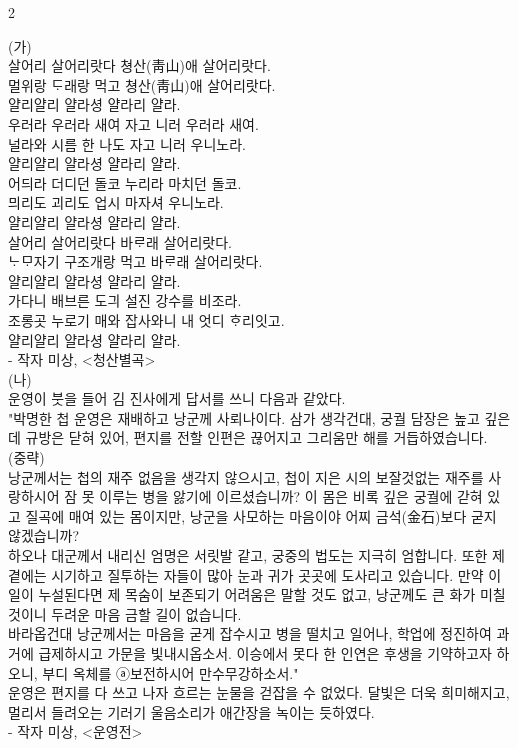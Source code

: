 \documentclass[10pt, a4paper]{article}
\begin{document}
\begin{multicols}{2}
\begin{passagebox}
\noindent{}(가) \\
살어리 살어리랏다 쳥산(靑山)애 살어리랏다. \\
멀위랑 ᄃᆞ래랑 먹고 쳥산(靑山)애 살어리랏다. \\
얄리얄리 얄라셩 얄라리 얄라.
\\[0.5em]
우러라 우러라 새여 자고 니러 우러라 새여. \\
널라와 시름 한 나도 자고 니러 우니노라. \\
얄리얄리 얄라셩 얄라리 얄라.
\\[0.5em]
어듸라 더디던 돌코 누리라 마치던 돌코. \\
믜리도 괴리도 업시 마자셔 우니노라. \\
얄리얄리 얄라셩 얄라리 얄라.
\\[0.5em]
살어리 살어리랏다 바ᄅᆞ래 살어리랏다. \\
ᄂᆞᄆᆞ자기 구조개랑 먹고 바ᄅᆞ래 살어리랏다. \\
얄리얄리 얄라셩 얄라리 얄라.
\\[0.5em]
가다니 배브른 도긔 설진 강수를 비조라. \\
조롱곳 누로기 매와 잡사와니 내 엇디 ᄒᆞ리잇고. \\
얄리얄리 얄라셩 얄라리 얄라.
\\[0.5em]
- 작자 미상, <청산별곡>
\\[0.5em]
(나) \\
운영이 붓을 들어 김 진사에게 답서를 쓰니 다음과 같았다. \\
"박명한 첩 운영은 재배하고 낭군께 사뢰나이다. 삼가 생각건대, 궁궐 담장은 높고 깊은데 규방은 닫혀 있어, 편지를 전할 인편은 끊어지고 그리움만 해를 거듭하였습니다. \\
(중략) \\
낭군께서는 첩의 재주 없음을 생각지 않으시고, 첩이 지은 시의 보잘것없는 재주를 사랑하시어 잠 못 이루는 병을 앓기에 이르셨습니까? 이 몸은 비록 깊은 궁궐에 갇혀 있고 질곡에 매여 있는 몸이지만, 낭군을 사모하는 마음이야 어찌 금석(金石)보다 굳지 않겠습니까? \\
하오나 대군께서 내리신 엄명은 서릿발 같고, 궁중의 법도는 지극히 엄합니다. 또한 제 곁에는 시기하고 질투하는 자들이 많아 눈과 귀가 곳곳에 도사리고 있습니다. 만약 이 일이 누설된다면 제 목숨이 보존되기 어려움은 말할 것도 없고, 낭군께도 큰 화가 미칠 것이니 두려운 마음 금할 길이 없습니다. \\
바라옵건대 낭군께서는 마음을 굳게 잡수시고 병을 떨치고 일어나, 학업에 정진하여 과거에 급제하시고 가문을 빛내시옵소서. 이승에서 못다 한 인연은 후생을 기약하고자 하오니, 부디 옥체를 ⓐ보전하시어 만수무강하소서." \\
운영은 편지를 다 쓰고 나자 흐르는 눈물을 걷잡을 수 없었다. 달빛은 더욱 희미해지고, 멀리서 들려오는 기러기 울음소리가 애간장을 녹이는 듯하였다.
\\[0.5em]
- 작자 미상, <운영전>
\end{passagebox}
\vspace{1mm}


\end{multicols}
\end{document}
